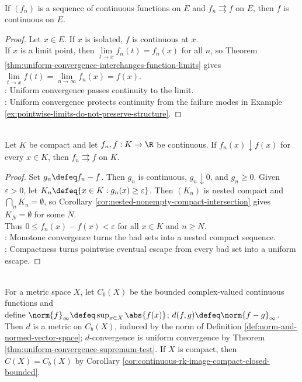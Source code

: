 \begin{theorem} \label{thm:uniform-convergence-preserves-continuity}\label{thm:uniform-convergence-main-source-todo} \\
If $(f_n)$ is a sequence of continuous functions on $E$ and $f_n\rightrightarrows f$ on $E$, then $f$ is continuous on $E$.
\begin{proof}
Let $x\in E$. If $x$ is isolated, $f$ is continuous at $x$.\\
If $x$ is a limit point, then $\lim\limits_{t\to x}f_n(t)=f_n(x)$ for all $n$, so Theorem \ref{thm:uniform-convergence-interchanges-function-limits} gives $\lim\limits_{t\to x}f(t)=\lim\limits_{n\to\infty}f_n(x)=f(x)$.\\
: Uniform convergence passes continuity to the limit.\\
: Uniform convergence protects continuity from the failure modes in Example \ref{ex:pointwise-limits-do-not-preserve-structure}.
\end{proof}
\end{theorem}

\begin{theorem} \label{thm:dini-monotone-uniform-convergence} \\
Let $K$ be compact and let $f_n,f:K\to\R$ be continuous. If $f_n(x)\downarrow f(x)$ for every $x\in K$, then $f_n\rightrightarrows f$ on $K$.
\begin{proof}
Set $g_n\defeq f_n-f$. Then $g_n$ is continuous, $g_n\downarrow0$, and $g_n\geq0$. Given $\varepsilon>0$, let $K_n\defeq\{x\in K:g_n(x)\geq\varepsilon\}$. Then $(K_n)$ is nested compact and $\bigcap_n K_n=\emptyset$, so Corollary \ref{cor:nested-nonempty-compact-intersection} gives $K_N=\emptyset$ for some $N$.\\
Thus $0\leq f_n(x)-f(x)<\varepsilon$ for all $x\in K$ and $n\geq N$.\\
: Monotone convergence turns the bad sets into a nested compact sequence.\\
: Compactness turns pointwise eventual escape from every bad set into a uniform escape.
\end{proof}
\end{theorem}

\begin{definition} \label{def:supremum-norm-continuous-functions} \\
For a metric space $X$, let $C_b(X)$ be the bounded complex-valued continuous functions and\\
define $\norm{f}_{\infty}\defeq\sup_{x\in X}\abs{f(x)}$; $d(f,g)\defeq\norm{f-g}_{\infty}$.\\
Then $d$ is a metric on $C_b(X)$, induced by the norm of Definition \ref{def:norm-and-normed-vector-space}; $d$-convergence is uniform convergence by Theorem \ref{thm:uniform-convergence-supremum-test}. If $X$ is compact, then $C(X)=C_b(X)$ by Corollary \ref{cor:continuous-rk-image-compact-closed-bounded}.
\end{definition}

